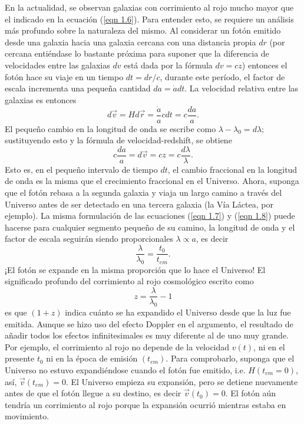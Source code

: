 \documentclass[a4paper,openright,10pt, oneside, final]{book}
\begin{document}
En la actualidad, se observan galaxias con corrimiento al rojo mucho mayor que el indicado en la ecuación (\ref{eqn 1.6}). Para entender esto, se requiere un análisis más profundo sobre la naturaleza del mismo. Al considerar un fotón emitido desde una galaxia hacia una galaxia cercana con una distancia propia $dr$ (por cercana entiéndase lo bastante próxima para suponer que la diferencia de velocidades entre las galaxias $dv$ está dada por la fórmula $dv = cz$) entonces el fotón hace su viaje en un tiempo $dt = dr/c$, durante este período, el factor de escala incrementa una pequeña cantidad $da = \dot{a} dt$. La velocidad relativa entre las galaxias es entonces
\begin{equation}
d\vec{v}=Hd\vec{r}=\frac{\dot{a}}{a}cdt=c\frac{da}{a}.\label{eqn 1.7}
\end{equation}
El pequeño cambio en la longitud de onda se escribe como $ \lambda - \lambda_{0} = d\lambda$; sustituyendo esto y la fórmula de velocidad-redshift, se obtiene
\begin{equation}
c\frac{da}{a}=d\vec{v}=cz=c\frac{d\lambda}{\lambda}.\label{eqn 1.8}
\end{equation}
Esto es, en el pequeño intervalo de tiempo $dt$, el cambio fraccional en la longitud de onda es la misma que el crecimiento fraccional en el Universo. Ahora, suponga que el fotón rebasa a la segunda galaxia y viaja un largo camino a través del Universo antes de ser detectado en una tercera galaxia (la Vía Láctea, por ejemplo). La misma formulación de las ecuaciones (\ref{eqn 1.7}) y (\ref{eqn 1.8}) puede hacerse para cualquier segmento pequeño de su camino, la longitud de onda y el factor de escala seguirán siendo proporcionales $\lambda \propto a$, es decir
\begin{equation}
\frac{\lambda}{\lambda_{0}}= \frac{t_{0}}{t_{em}}.\label{eqn 1.9}
\end{equation}
¡El fotón se expande en la misma proporción que lo hace el Universo! El significado profundo del corrimiento al rojo cosmológico escrito como
\begin{equation}
z = \frac{\lambda}{\lambda_{0}} - 1\label{eqn 1.10}
\end{equation} 
es que $(1+z)$ indica cuánto se ha expandido el Universo desde que la luz fue emitida. Aunque se hizo uso del efecto Doppler en el argumento, el resultado de añadir todos los efectos infinitesimales es muy diferente al de uno muy grande. Por ejemplo, el corrimiento al rojo no depende de la velocidad $v(t)$, ni en el presente $t_{0}$ ni en la época de emisión $(t_{em})$. Para comprobarlo, suponga que el Universo no estuvo expandiéndose cuando el fotón fue emitido, i.e. $H(t_{em}=0)$, así, $\vec{v}(t_{em})=0$. El Universo empieza su expansión, pero se detiene nuevamente antes de que el fotón llegue a su destino, es decir $\vec{v}(t_{0})=0$. El fotón aún tendría un corrimiento al rojo porque la expansión ocurrió mientras estaba en movimiento.
\end{document}

